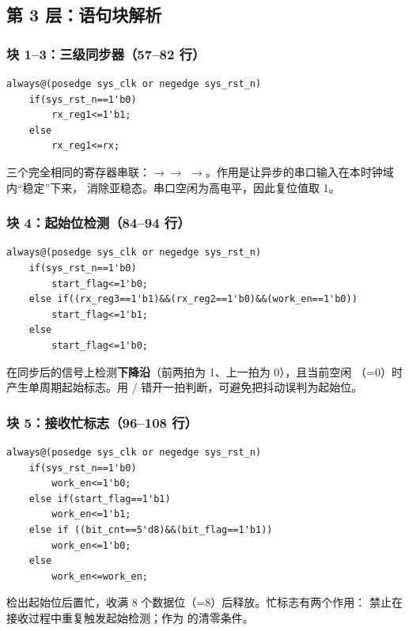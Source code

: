 \subsection{第 3 层：语句块解析}

\subsubsection{块 1--3：三级同步器（57--82 行）}

\begin{lstlisting}[style=vsnip]
always@(posedge sys_clk or negedge sys_rst_n)
    if(sys_rst_n==1'b0)
        rx_reg1<=1'b1;
    else
        rx_reg1<=rx;
\end{lstlisting}

三个完全相同的寄存器串联：$\rightarrow$$\rightarrow$
$\rightarrow$。作用是让异步的串口输入在本时钟域内“稳定”下来，
消除亚稳态。串口空闲为高电平，因此复位值取 1。

\subsubsection{块 4：起始位检测（84--94 行）}

\begin{lstlisting}[style=vsnip]
always@(posedge sys_clk or negedge sys_rst_n)
    if(sys_rst_n==1'b0)
        start_flag<=1'b0;
    else if((rx_reg3==1'b1)&&(rx_reg2==1'b0)&&(work_en==1'b0))
        start_flag<=1'b1;
    else
        start_flag<=1'b0;
\end{lstlisting}

在同步后的信号上检测\textbf{下降沿}（前两拍为 1、上一拍为 0），且当前空闲
（=0）时产生单周期起始标志。用 /
错开一拍判断，可避免把抖动误判为起始位。

\subsubsection{块 5：接收忙标志（96--108 行）}

\begin{lstlisting}[style=vsnip]
always@(posedge sys_clk or negedge sys_rst_n)
    if(sys_rst_n==1'b0)
        work_en<=1'b0;
    else if(start_flag==1'b1)
        work_en<=1'b1;
    else if ((bit_cnt==5'd8)&&(bit_flag==1'b1))
        work_en<=1'b0;
    else
        work_en<=work_en;
\end{lstlisting}

检出起始位后置忙，收满 8 个数据位（=8）后释放。忙标志有两个作用：
禁止在接收过程中重复触发起始检测；作为  的清零条件。

